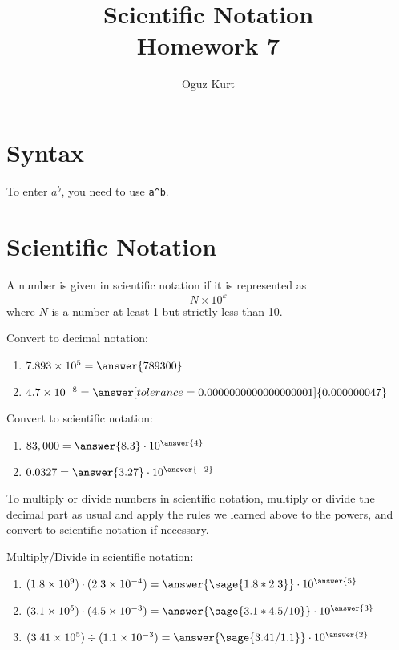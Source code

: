 \documentclass{ximera}
\title{Scientific Notation\\ Homework 7}
\author{Oguz Kurt}
\begin{document}
\maketitle

\section*{Syntax}
To enter {\Large $a^b$}, you need to use {\Large \color{red}\verb|a^b|}.

\section*{Scientific Notation}
\begin{definition}
    A number is given in scientific notation if it is represented as $$N\times 10^k$$ where $N$ is a number at least 1 but strictly less than 10.
\end{definition}

\begin{problem}
Convert to decimal notation:
\begin{enumerate}
    \item $7.893 \times 10^5 = \answer{789300}$
    \item $4.7 \times 10^{-8} = \answer[tolerance=0.0000000000000000001]{0.000000047} $
\end{enumerate}
\end{problem}

\begin{problem}
Convert to scientific notation:
\begin{enumerate}
    \item $83,000 = \answer{8.3} \cdot 10^{\answer{4}}$
    \item $ 0.0327 = \answer{3.27}\cdot 10^{\answer{-2}}$
\end{enumerate}
\end{problem}

\begin{remark}
To multiply or divide numbers in scientific notation, multiply or divide the decimal part as usual and apply the rules we learned above to the powers, and convert to scientific notation if necessary.
\end{remark}

\begin{problem}
Multiply/Divide in scientific notation:

\begin{enumerate}
    \item $(1.8 \times 10^9) \cdot (2.3 \times 10^{-4}) = \answer{\sage{1.8*2.3}}\cdot 10^{\answer{5}}$
    \item $(3.1 \times 10^5) \cdot (4.5 \times 10^{-3}) = \answer{\sage{3.1*4.5/10}}\cdot 10^{\answer{3}} $
    \item $(3.41 \times 10^5) \div (1.1 \times 10^{-3}) = \answer{\sage{3.41/1.1}}\cdot 10^{\answer{2}} $
\end{enumerate}
\end{problem}
\end{document}
